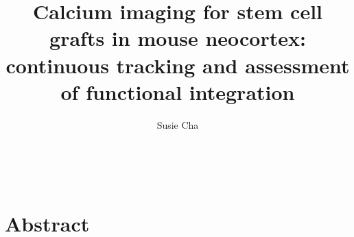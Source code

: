 \title{Calcium imaging for stem cell grafts in mouse neocortex: continuous tracking and assessment of functional integration}
\author{Susie Cha}

\
\tableofcontents

\section{Abstract}